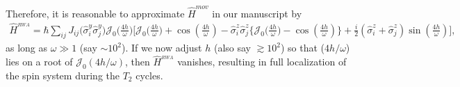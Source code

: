 \documentclass[aps,prb,reprint,showpacs,floatfix,superscriptaddress, onecolumn, 9pt]{revtex4-2}
\begin{document}
\begin{enumerate}
{    Therefore, it is reasonable to approximate   $\hat{H}^{mov}$ in our manuscript by 
    \begin{align}
		\hat{H}^{_{RWA}} = \hbar\sum_{ij} J_{ij} \Big(\hat{\sigma}^y_i\hat{\sigma}^y_j\Big) \mathcal{J}_0\Big(\frac{4h}{\omega}\Big)\Bigg[\mathcal{J}_0\Big(\frac{4h}{\omega}\Big) + \cos(\frac{4h}{\omega}) -\hat{\sigma}^z_i\hat{\sigma}^z_j \Bigg\{\mathcal{J}_0\Big(\frac{4h}{\omega}\Big) - \cos(\frac{4h}{\omega})\Bigg\} + \frac{i}{2} (\hat{\sigma}^z_i + \hat{\sigma}^z_j) \sin(\frac{4h}{\omega})\Bigg],
	\end{align}
    as long as $\omega\gg 1$ (say $\sim 10^2$). If we now adjust $h$ (also say $\gtrsim 10^2$) so that ($4h/\omega$) lies on a root of $\mathcal{J}_0(4h/\omega)$, then $\hat{H}^{_{RWA}}$ vanishes, resulting in full localization of the spin system during the $T_2$ cycles.

}
\end{enumerate}
\end{document}
